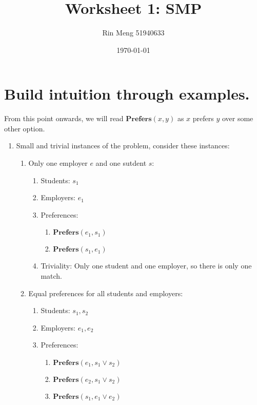 \documentclass[12pt]{article}
\title{Worksheet 1: SMP}
\author{Rin Meng 51940633}
\date{\today}
\begin{document}
\maketitle

\section{Build intuition through examples.}
    From this point onwards, we will read $\textbf{Prefers}(x, y)$ as $x$ prefers $y$ over some other option.

    \begin{enumerate}
        \item Small and trivial instances of the problem, consider these instances:
            \begin{enumerate}
                \item Only one employer $e$ and one sutdent $s$:
                \begin{enumerate}[-]
                    \item Students: ${s_1}$
                    \item Employers: ${e_1}$
                    \item Preferences: 
                        \begin{enumerate}
                            \item $\textbf{Prefers}(e_1, s_1)$
                            \item $\textbf{Prefers}(s_1, e_1)$
                        \end{enumerate}
                    \item Triviality: Only one student and one employer, so there is only one match.
                \end{enumerate}
                \item Equal preferences for all students and employers:
                \begin{enumerate}
                    \item Students: ${s_1, s_2}$
                    \item Employers: ${e_1, e_2}$
                    \item Preferences:
                        \begin{enumerate}
                            \item $\textbf{Prefers}(e_1, s_1 \lor s_2)$
                            \item $\textbf{Prefers}(e_2, s_1 \lor s_2)$
                            \item $\textbf{Prefers}(s_1, e_1 \lor e_2)$

\end{enumerate}
\end{enumerate}
\end{enumerate}
\end{enumerate}
\end{document}
